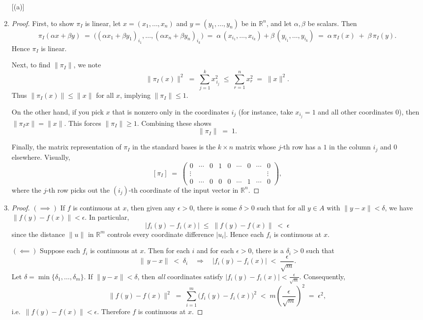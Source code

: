 \documentclass[11pt]{article}
\begin{document}
\begin{exercise}{5}
    \begin{enumerate} [(a)]
        \item \begin{proof}
            First, to show $\pi_I$ is linear, let $x=(x_1,\ldots,x_n)$ and $y=(y_1,\ldots,y_n)$ be in $\mathbb{R}^n$, and let $\alpha,\beta$ be scalars. Then
\[
  \pi_I(\alpha x + \beta y)
  \;=\;\bigl((\alpha x_1 + \beta y_1)_{i_1}, \dots, (\alpha x_n + \beta y_n)_{i_k}\bigr)
  \;=\;\alpha\,(x_{i_1},\dots,x_{i_k}) + \beta\,(y_{i_1},\dots,y_{i_k})
  \;=\;\alpha\,\pi_I(x)\;+\;\beta\,\pi_I(y).
\]
Hence $\pi_I$ is linear.

        Next, to find $\|\pi_I\|$, we note
\[
  \|\pi_I(x)\|^2
    \;=\;\sum_{j=1}^k x_{\,i_j}^2
    \;\le\;\sum_{r=1}^n x_r^2
    \;=\;\|x\|^2.
\]
Thus $\|\pi_I(x)\|\le\|x\|$ for all $x$, implying $\|\pi_I\|\le1$.  

On the other hand, if you pick $x$ that is nonzero only in the coordinates $i_j$ (for instance, take $x_{i_j}=1$ and all other coordinates $0$), then $\|\pi_I x\|=\|x\|$.  This forces $\|\pi_I\|\ge1$.  Combining these shows
\[
  \|\pi_I\|\;=\;1.
\]

Finally, the matrix representation of $\pi_I$ in the standard bases is the $k\times n$ matrix whose $j$-th row has a $1$ in the column $i_j$ and $0$ elsewhere.  Visually,
\[
 [\pi_I]
   \;=\;
   \begin{pmatrix}
     0 & \cdots & 0 & 1 & 0 & \cdots & 0 & \cdots & 0\\
     \vdots &&&&&&&&\vdots\\
     0 & \cdots & 0 & 0 & 0 & \cdots & 1 & \cdots & 0
   \end{pmatrix},
\]
where the $j$-th row picks out the $(i_j)$-th coordinate of the input vector in $\mathbb{R}^n$.
        \end{proof}
        \item \begin{proof}

        $(\implies)$ If $f$ is continuous at $x$, then given any $\epsilon>0$, there is some $\delta>0$ such that for all $y\in A$ with $\|y-x\|<\delta$, we have $\|f(y)-f(x)\|<\epsilon$.  In particular,
\[
 |f_i(y) - f_i(x)|
  \;\le\;\|f(y)-f(x)\|
  \;<\;\epsilon
\]
since the distance $\|u\|$ in $\mathbb{R}^m$ controls every coordinate difference $|u_i|$.  
Hence each $f_i$ is continuous at $x$.

    $(\impliedby)$ Suppose each $f_i$ is continuous at $x$.  Then for each $i$ and for each $\epsilon>0$, there is a $\delta_i>0$ such that
\[
 \|\,y - x\|\;<\;\delta_i
   \quad\Longrightarrow\quad
 |f_i(y) - f_i(x)| \;<\;\frac{\epsilon}{\sqrt{m}}.
\]
Let $\delta=\min\{\delta_1,\dots,\delta_m\}$.  If $\|y-x\|<\delta$, then \emph{all} coordinates satisfy $|f_i(y)-f_i(x)|<\tfrac{\epsilon}{\sqrt{m}}$.  Consequently,
\[
 \|f(y)-f(x)\|^2
   \;=\;\sum_{i=1}^m \bigl(f_i(y)-f_i(x)\bigr)^2
   \;<\;m \left(\frac{\epsilon}{\sqrt{m}}\right)^2
   \;=\;\epsilon^2,
\]
i.e.\ $\|f(y)-f(x)\|<\epsilon$.  Therefore $f$ is continuous at $x$.  


\end{proof}
\end{enumerate}
\end{exercise}
\end{document}
